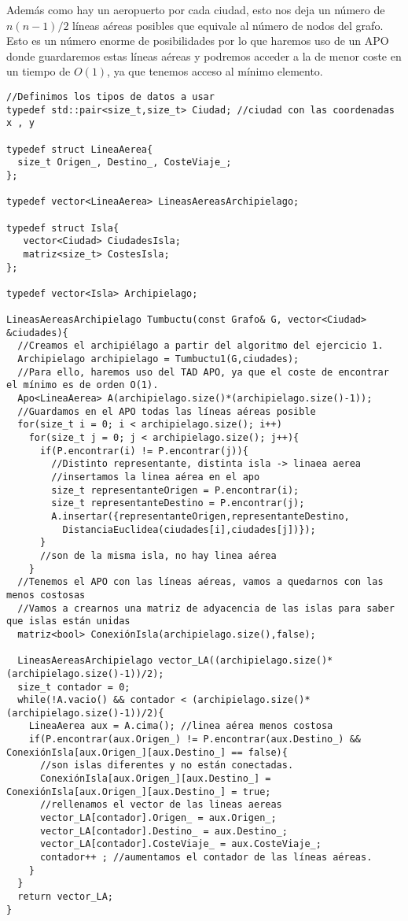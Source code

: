 Además como hay un aeropuerto por cada ciudad, esto nos deja un número de \(n(n-1)/2\) líneas aéreas posibles que equivale al número de nodos del grafo. Esto es un número enorme de posibilidades por lo que haremos uso de un APO donde guardaremos estas líneas aéreas y podremos acceder a la de menor coste en un tiempo de \(O(1)\), ya que tenemos acceso al mínimo elemento.      

\begin{verbatim}
//Definimos los tipos de datos a usar
typedef std::pair<size_t,size_t> Ciudad; //ciudad con las coordenadas x , y

typedef struct LineaAerea{
  size_t Origen_, Destino_, CosteViaje_;
};

typedef vector<LineaAerea> LineasAereasArchipielago;

typedef struct Isla{
   vector<Ciudad> CiudadesIsla;
   matriz<size_t> CostesIsla;
};

typedef vector<Isla> Archipielago;

LineasAereasArchipielago Tumbuctu(const Grafo& G, vector<Ciudad> &ciudades){
  //Creamos el archipiélago a partir del algoritmo del ejercicio 1.
  Archipielago archipielago = Tumbuctu1(G,ciudades);
  //Para ello, haremos uso del TAD APO, ya que el coste de encontrar el mínimo es de orden O(1).
  Apo<LineaAerea> A(archipielago.size()*(archipielago.size()-1));
  //Guardamos en el APO todas las líneas aéreas posible
  for(size_t i = 0; i < archipielago.size(); i++)
    for(size_t j = 0; j < archipielago.size(); j++){
      if(P.encontrar(i) != P.encontrar(j)){
        //Distinto representante, distinta isla -> linaea aerea
        //insertamos la linea aérea en el apo
        size_t representanteOrigen = P.encontrar(i);
        size_t representanteDestino = P.encontrar(j);
        A.insertar({representanteOrigen,representanteDestino,
          DistanciaEuclidea(ciudades[i],ciudades[j])});
      }
      //son de la misma isla, no hay linea aérea
    }
  //Tenemos el APO con las líneas aéreas, vamos a quedarnos con las menos costosas
  //Vamos a crearnos una matriz de adyacencia de las islas para saber que islas están unidas
  matriz<bool> ConexiónIsla(archipielago.size(),false);

  LineasAereasArchipielago vector_LA((archipielago.size()*(archipielago.size()-1))/2);
  size_t contador = 0;
  while(!A.vacio() && contador < (archipielago.size()*(archipielago.size()-1))/2){
    LineaAerea aux = A.cima(); //linea aérea menos costosa
    if(P.encontrar(aux.Origen_) != P.encontrar(aux.Destino_) && ConexiónIsla[aux.Origen_][aux.Destino_] == false){ 
      //son islas diferentes y no están conectadas. 
      ConexiónIsla[aux.Origen_][aux.Destino_] = ConexiónIsla[aux.Origen_][aux.Destino_] = true;
      //rellenamos el vector de las lineas aereas
      vector_LA[contador].Origen_ = aux.Origen_;
      vector_LA[contador].Destino_ = aux.Destino_;
      vector_LA[contador].CosteViaje_ = aux.CosteViaje_;
      contador++ ; //aumentamos el contador de las líneas aéreas.
    }
  }
  return vector_LA;
}
\end{verbatim}


